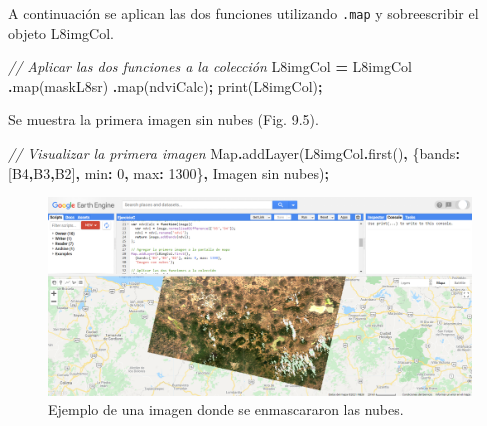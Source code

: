 \documentclass[
  12pt,
  letterpaper,
  twoside]{book}
\newenvironment{Shaded}{\begin{snugshade}}{\end{snugshade}}
\newcommand{\BuiltInTok}[1]{#1}
\newcommand{\CommentTok}[1]{\textcolor[rgb]{0.56,0.35,0.01}{\textit{#1}}}
\newcommand{\DataTypeTok}[1]{\textcolor[rgb]{0.13,0.29,0.53}{#1}}
\newcommand{\DecValTok}[1]{\textcolor[rgb]{0.00,0.00,0.81}{#1}}
\newcommand{\FunctionTok}[1]{\textcolor[rgb]{0.00,0.00,0.00}{#1}}
\newcommand{\NormalTok}[1]{#1}
\newcommand{\OperatorTok}[1]{\textcolor[rgb]{0.81,0.36,0.00}{\textbf{#1}}}
\newcommand{\StringTok}[1]{\textcolor[rgb]{0.31,0.60,0.02}{#1}}
\begin{document}
A continuación se aplican las dos funciones utilizando \texttt{.map} y sobreescribir el objeto L8imgCol.

\begin{Shaded}
\begin{Highlighting}[]
\CommentTok{// Aplicar las dos funciones a la colección}
\NormalTok{L8imgCol }\OperatorTok{=}\NormalTok{ L8imgCol}
  \OperatorTok{.}\FunctionTok{map}\NormalTok{(maskL8sr)}
  \OperatorTok{.}\FunctionTok{map}\NormalTok{(ndviCalc)}\OperatorTok{;}
\FunctionTok{print}\NormalTok{(L8imgCol)}\OperatorTok{;}
\end{Highlighting}
\end{Shaded}

Se muestra la primera imagen sin nubes (Fig. 9.5).

\begin{Shaded}
\begin{Highlighting}[]
\CommentTok{// Visualizar la primera imagen}
\BuiltInTok{Map}\OperatorTok{.}\FunctionTok{addLayer}\NormalTok{(L8imgCol}\OperatorTok{.}\FunctionTok{first}\NormalTok{()}\OperatorTok{,} 
\NormalTok{  \{}\DataTypeTok{bands}\OperatorTok{:}\NormalTok{[}\StringTok{\textquotesingle{}B4\textquotesingle{}}\OperatorTok{,}\StringTok{\textquotesingle{}B3\textquotesingle{}}\OperatorTok{,}\StringTok{\textquotesingle{}B2\textquotesingle{}}\NormalTok{]}\OperatorTok{,} \DataTypeTok{min}\OperatorTok{:} \DecValTok{0}\OperatorTok{,} \DataTypeTok{max}\OperatorTok{:} \DecValTok{1300}\NormalTok{\}}\OperatorTok{,}
  \StringTok{\textquotesingle{}Imagen sin nubes\textquotesingle{}}\NormalTok{)}\OperatorTok{;}
\end{Highlighting}
\end{Shaded}

\begin{figure}[btp]

{\centering \includegraphics[width=1\linewidth]{Img/imSinNubes} 

}

\caption{Ejemplo de una imagen donde se enmascararon las nubes.}\label{fig:unnamed-chunk-160}
\end{figure}
\end{document}
